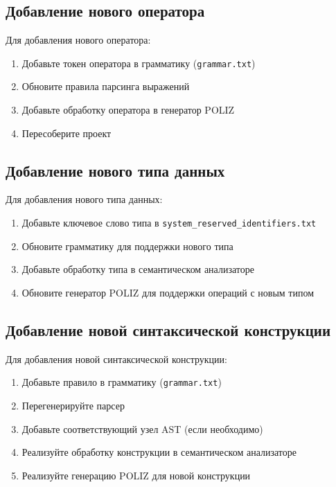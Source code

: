 \documentclass[12pt,a4paper]{article}
\begin{document}
\subsection{Добавление нового оператора}

Для добавления нового оператора:

\begin{enumerate}
    \item Добавьте токен оператора в грамматику (\texttt{grammar.txt})
    \item Обновите правила парсинга выражений
    \item Добавьте обработку оператора в генератор POLIZ
    \item Пересоберите проект
\end{enumerate}

\subsection{Добавление нового типа данных}

Для добавления нового типа данных:

\begin{enumerate}
    \item Добавьте ключевое слово типа в \texttt{system\_reserved\_identifiers.txt}
    \item Обновите грамматику для поддержки нового типа
    \item Добавьте обработку типа в семантическом анализаторе
    \item Обновите генератор POLIZ для поддержки операций с новым типом
\end{enumerate}

\subsection{Добавление новой синтаксической конструкции}

Для добавления новой синтаксической конструкции:

\begin{enumerate}
    \item Добавьте правило в грамматику (\texttt{grammar.txt})
    \item Перегенерируйте парсер
    \item Добавьте соответствующий узел AST (если необходимо)
    \item Реализуйте обработку конструкции в семантическом анализаторе
    \item Реализуйте генерацию POLIZ для новой конструкции
\end{enumerate}
\end{document}
